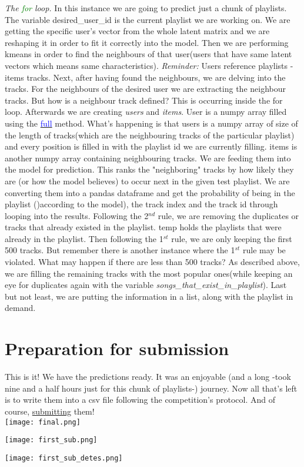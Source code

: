 \documentclass[]{article}
\begin{document}
\textit{The \textcolor{Green}{for} loop.} In this instance we are going to predict just a chunk of playlists. The variable desired\_user\_id is the current playlist we are working on. We are getting the specific user's vector from the whole latent matrix and we are reshaping it in order to fit it correctly into the model. Then we are performing kmeans in order to find the neighbours of that user(users that have same latent vectors which means same characteristics). \textit{Reminder: } Users reference playlists - items tracks.
Next, after having found the neighbours, we are delving into the tracks. For the neighbours of the desired user we are extracting the neighbour tracks. But how is a neighbour track defined? This is occurring inside the for loop.
Afterwards we are creating \textit{users} and \textit{items}. User is a numpy array filled using the \href{https://numpy.org/doc/stable/reference/generated/numpy.full.html}{\textcolor{Blue}{full}} method. What's happening is that users is a numpy array of size of the length of tracks(which are the neighbouring tracks of the particular playlist) and every position is filled in with the playlist id we are currently filling. items is another numpy array containing neighbouring tracks. We are feeding them into the model for prediction. This ranks the "neighboring" tracks by how likely they are (or how the model believes) to occur next in the given test playlist.
We are converting them into a pandas dataframe and get the probability of being in the playlist ()according to the model), the track index and the track id through looping into the results.
Following the 2$^{nd}$ rule, we are removing the duplicates or tracks that already existed in the playlist. temp holds the playlists that were already in the playlist. Then following the 1$^{st}$ rule, we are only keeping the first 500 tracks. But remember there is another instance where the 1$^{st}$ rule may be violated. What may happen if there are less than 500 tracks? As described above, we are filling the remaining tracks with the most popular ones(while keeping an eye for duplicates again with the variable \textit{songs\_that\_exist\_in\_playlist}). Last but not least, we are putting the information in a list, along with the playlist in demand.

\section{Preparation for submission}
This is it! We have the predictions ready. It was an enjoyable (and a long -took nine and a half hours just for this chunk of playlists-) journey. Now all that's left is to write them into a csv file following the competition's protocol. And of course, \href{https://www.aicrowd.com/9f000fa0-61d6-438f-9df7-62a205a3ef6c}{submitting} them!
\\
\texttt{[image: final.png]}

\texttt{[image: first\_sub.png]}

\texttt{[image: first\_sub\_detes.png]}
\end{document}

